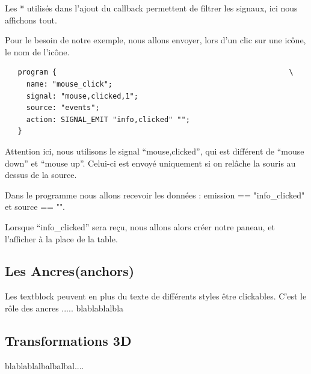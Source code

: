 \documentclass[a4paper]{efr}
\begin{document}
Les * utilisés dans l'ajout du callback permettent de filtrer les signaux, ici
nous affichons tout.

Pour le besoin de notre exemple, nous allons envoyer, lors d'un clic sur une
icône, le nom de l'icône.
\begin{lstlisting}
   program {                                                      \
     name: "mouse_click";
     signal: "mouse,clicked,1";
     source: "events";
     action: SIGNAL_EMIT "info,clicked" "";
   }
\end{lstlisting}

Attention ici, nous utilisons le signal ``mouse,clicked'', qui est différent de
``mouse down'' et ``mouse up''. Celui-ci est envoyé uniquement si on relâche la souris
au dessus de la source.

Dans le programme nous allons recevoir les données : emission == "info\_clicked"
et source == "".

Lorsque ``info\_clicked'' sera reçu, nous allons alors créer notre paneau, et
l'afficher à la place de la table.

\subsection{Les Ancres(anchors)}

Les textblock peuvent en plus du texte de différents styles être clickables.
C'est le rôle des ancres ..... blablablalbla

\subsection{Transformations 3D}

blablablalbalbalbal....
\end{document}
